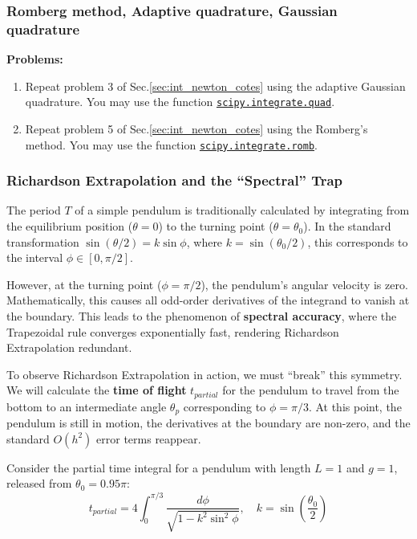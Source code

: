 \subsubsection{Romberg method, Adaptive quadrature, Gaussian quadrature}

\textbf{Problems:}
\begin{enumerate}
\item Repeat problem 3 of Sec.\ref{sec:int_newton_cotes} using the adaptive Gaussian quadrature. You may use the function \href{https://docs.scipy.org/doc//scipy-1.13.0/reference/generated/scipy.integrate.quad.html#scipy.integrate.quad}{\texttt{scipy.integrate.quad}}.
\item Repeat problem 5 of Sec.\ref{sec:int_newton_cotes} using the Romberg's method. You may use the function \href{https://docs.scipy.org/doc//scipy-1.13.0/reference/generated/scipy.integrate.romb.html#scipy.integrate.romb}{\texttt{scipy.integrate.romb}}.
\end{enumerate}


\subsubsection{Richardson Extrapolation and the ``Spectral'' Trap}

The period $T$ of a simple pendulum is traditionally calculated by integrating from the equilibrium position ($\theta=0$) to the turning point ($\theta=\theta_0$). In the standard transformation $\sin(\theta/2) = k \sin\phi$, where $k = \sin(\theta_0/2)$, this corresponds to the interval $\phi \in [0, \pi/2]$.

However, at the turning point ($\phi = \pi/2$), the pendulum's angular velocity is zero. Mathematically, this causes all odd-order derivatives of the integrand to vanish at the boundary. This leads to the phenomenon of \textbf{spectral accuracy}, where the Trapezoidal rule converges exponentially fast, rendering Richardson Extrapolation redundant.

To observe Richardson Extrapolation in action, we must ``break'' this symmetry. We will calculate the \textbf{time of flight} $t_{partial}$ for the pendulum to travel from the bottom to an intermediate angle $\theta_{p}$ corresponding to $\phi = \pi/3$. At this point, the pendulum is still in motion, the derivatives at the boundary are non-zero, and the standard $O(h^2)$ error terms reappear.

Consider the partial time integral for a pendulum with length $L=1$ and $g=1$, released from $\theta_0 = 0.95\pi$:
$$ t_{partial} = 4 \int_{0}^{\pi/3} \frac{d\phi}{\sqrt{1 - k^2 \sin^2\phi}}, \quad k = \sin\left(\frac{\theta_0}{2}\right) $$

